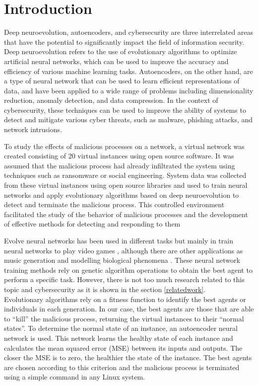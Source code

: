 \documentclass{iosart2c}
\begin{document}
\section{Introduction}
Deep neuroevolution, autoencoders, and cybersecurity are three interrelated areas that have the potential to significantly impact the field of information security. Deep neuroevolution refers to the use of evolutionary algorithms to optimize artificial neural networks, which can be used to improve the accuracy and efficiency of various machine learning tasks. Autoencoders, on the other hand, are a type of neural network that can be used to learn efficient representations of data, and have been applied to a wide range of problems including dimensionality reduction, anomaly detection, and data compression. In the context of cybersecurity, these techniques can be used to improve the ability of systems to detect and mitigate various cyber threats, such as malware, phishing attacks, and network intrusions.

To study the effects of malicious processes on a network, a virtual network was created consisting of 20 virtual instances using open source software. It was assumed that the malicious process had already infiltrated the system using techniques such as ransomware or social engineering. System data was collected from these virtual instances using open source libraries and used to train neural networks and apply evolutionary algorithms based on deep neuroevolution to detect and terminate the malicious process. This controlled environment facilitated the study of the behavior of malicious processes and the development of effective methods for detecting and responding to them

Evolve neural networks has been used in different tasks but mainly in train neural networks to play video games \cite{deepGA, neuroevolution1, neuroevolution2}, although there are other applications as music generation \cite{neuroevolution3} and modelling biological phenomena \cite{neuroevolution4}. These neural network training methods rely on genetic algorithm operations to obtain the best agent to perform a specific task. However, there is not too much research related to this topic and cybersecurity as it is shown in the section \ref{relatedwork}.\\

Evolutionary algorithms rely on a fitness function to identify the best agents or individuals in each generation. In our case, the best agents are those that are able to ``kill'' the malicious process, returning the virtual instances to their ``normal states''. To determine the normal state of an instance, an autoencoder neural network is used. This network learns the healthy state of each instance and calculates the mean squared error (MSE) between its inputs and outputs. The closer the MSE is to zero, the healthier the state of the instance. The best agents are chosen according to this criterion and the malicious process is terminated using a simple command in any Linux system.
\end{document}

